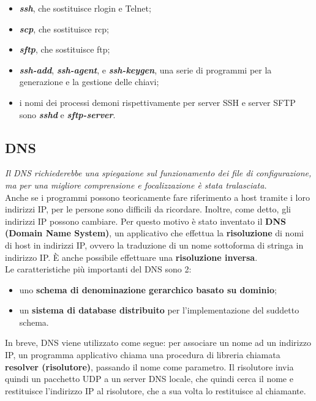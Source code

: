         \begin{itemize}
            \item \textbf{\emph{ssh}}, che sostituisce rlogin e Telnet;
            \item \textbf{\emph{scp}}, che sostituisce rcp;
            \item \textbf{\emph{sftp}}, che sostituisce ftp;
            \item \textbf{\emph{ssh-add}}, \textbf{\emph{ssh-agent}}, e \textbf{\emph{ssh-keygen}}, una serie di programmi per la generazione e la
            gestione delle chiavi;
            \item i nomi dei processi demoni rispettivamente per server SSH e server SFTP sono \textbf{\emph{sshd}} e
            \textbf{\emph{sftp-server}}.
        \end{itemize}

    \subsection{DNS}

        \emph{Il DNS richiederebbe una spiegazione sul funzionamento dei file di configurazione, ma per
        una migliore comprensione e focalizzazione è stata tralasciata.}\\

        Anche se i programmi possono teoricamente fare riferimento a host tramite i loro indirizzi IP,
        per le persone sono difficili da ricordare. Inoltre, come detto, gli indirizzi IP possono cambiare.
        Per questo motivo è stato inventato il \textbf{DNS (Domain Name System)}, un applicativo che effettua
        la \textbf{risoluzione} di nomi di host in indirizzi IP, ovvero la traduzione di un nome sottoforma di
        stringa in indirizzo IP. È anche possibile effettuare una \textbf{risoluzione inversa}.\\

        Le caratteristiche più importanti del DNS sono 2:
        \begin{itemize}
            \item uno \textbf{schema di denominazione gerarchico basato su dominio};
            \item un \textbf{sistema di database distribuito} per l’implementazione del suddetto schema.
        \end{itemize}

        In breve, DNS viene utilizzato come segue: per associare un nome ad un indirizzo IP, un
        programma applicativo chiama una procedura di libreria chiamata \textbf{resolver (risolutore)},
        passando il nome come parametro. Il risolutore invia quindi un pacchetto UDP a un server DNS
        locale, che quindi cerca il nome e restituisce l’indirizzo IP al risolutore, che a sua volta lo
        restituisce al chiamante.

